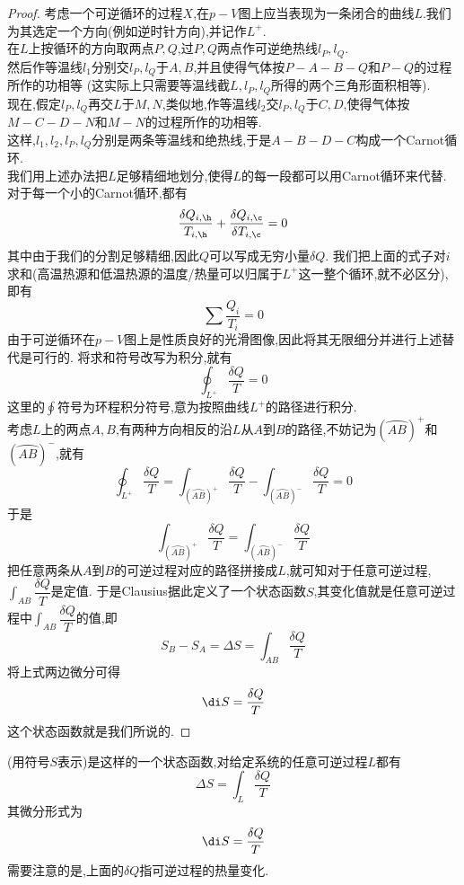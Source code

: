\documentclass{ctexart}
\begin{document}
\begin{proof}
    考虑一个可逆循环的过程$X$,在$p-V$图上应当表现为一条闭合的曲线$L$.我们为其选定一个方向(例如逆时针方向),并记作$L^+$.\\
    在$L$上按循环的方向取两点$P,Q$,过$P,Q$两点作可逆绝热线$l_P,l_Q$.\\
    然后作等温线$l_1$分别交$l_P,l_Q$于$A,B$,并且使得气体按$P-A-B-Q$和$P-Q$的过程所作的功相等%
    (这实际上只需要等温线截$L,l_P,l_Q$所得的两个三角形面积相等).\\
    现在,假定$l_P,l_Q$再交$L$于$M,N$,类似地,作等温线$l_2$交$l_P,l_Q$于$C,D$,使得气体按$M-C-D-N$和$M-N$的过程所作的功相等.\\
    这样,$l_1,l_2,l_P,l_Q$分别是两条等温线和绝热线,于是$A-B-D-C$构成一个Carnot循环.\\
    我们用上述办法把$L$足够精细地划分,使得$L$的每一段都可以用Carnot循环来代替.\\
    对于每一个小的Carnot循环,都有
    \[\dfrac{\delta Q_{i,\h}}{T_{i,\h}}+\dfrac{\delta Q_{i,\c}}{\delta T_{i,\c}}=0\]
    其中由于我们的分割足够精细,因此$Q$可以写成无穷小量$\delta Q$.%
    我们把上面的式子对$i$求和(高温热源和低温热源的温度/热量可以归属于$L^+$这一整个循环,就不必区分),即有
    \[\sum\dfrac{Q_i}{T_i}=0\]
    由于可逆循环在$p-V$图上是性质良好的光滑图像,因此将其无限细分并进行上述替代是可行的.%
    将求和符号改写为积分,就有
    \[\oint_{L^+}\dfrac{\delta Q}{T}=0\]
    这里的$\displaystyle\oint$符号为环程积分符号,意为按照曲线$L^+$的路径进行积分\footnotemark.\\
    考虑$L$上的两点$A,B$,有两种方向相反的沿$L$从$A$到$B$的路径,不妨记为$\left(\wideparen{AB}\right)^+$和$\left(\wideparen{AB}\right)^-$,就有
    \[\oint_{L^+}\dfrac{\delta Q}{T}=\int_{\left(\wideparen{AB}\right)^+}\dfrac{\delta Q}{T}-\int_{\left(\wideparen{AB}\right)^-}\dfrac{\delta Q}{T}=0\]
    于是
    \[\int_{\left(\wideparen{AB}\right)^+}\dfrac{\delta Q}{T}=\int_{\left(\wideparen{AB}\right)^-}\dfrac{\delta Q}{T}\]
    把任意两条从$A$到$B$的可逆过程对应的路径拼接成$L$,就可知对于任意可逆过程,$\displaystyle\int_{AB}\dfrac{\delta Q}{T}$是定值.%
    于是Clausius据此定义了一个状态函数$S$,其变化值就是任意可逆过程中$\displaystyle\int_{AB}\dfrac{\delta Q}{T}$的值,即
    \[S_{B}-S_{A}=\Delta S=\int_{AB}\dfrac{\delta Q}{T}\]
    将上式两边微分可得
    \[\di S=\dfrac{\delta Q}{T}\]
    这个状态函数就是我们所说的.
\end{proof}
\begin{definition}[3A.3.1 熵的热力学定义]
    (用符号$S$表示)是这样的一个状态函数,对给定系统的任意可逆过程$L$都有
    \[\Delta S=\int_{L}\dfrac{\delta Q}{T}\]
    其微分形式为
    \[\di S=\dfrac{\delta Q}{T}\]
    需要注意的是,上面的$\delta Q$指可逆过程的热量变化.
\end{definition}
\end{document}
